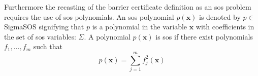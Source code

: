 \vspace{-1mm}
Furthermore the recasting of the barrier certificate definition as an \gls{sos} problem requires the use of \gls{sos} polynomials. An \gls{sos} polynomial $p(\mathbf{x})$ is denoted by $p\in$ \gls{SigmaSOS} signifying that $p$ is a polynomial in the variable $\mathbf{x}$ with coefficients in the set of \gls{sos} variables: $\Sigma$. A polynomial $p(\mathbf{x})$ is \gls{sos} if there exist polynomials $f_1,\dots,f_m$ such that \citep{bib:parrilo_sdp}
\vspace{-2mm}
\begin{equation}
p(\mathbf{x}) = \sum_{j=1}^{m}f_j^2(\mathbf{x}) \label{eq:sos_f_squared}
\end{equation}
%

